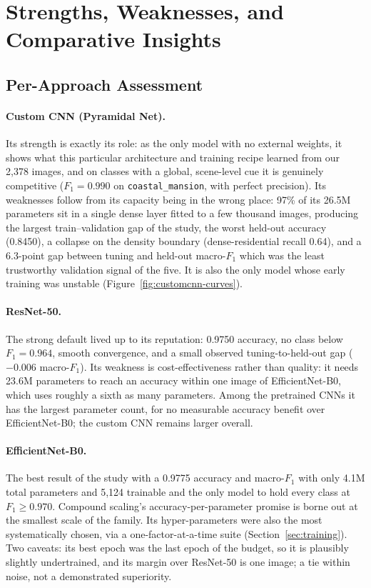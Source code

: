 \documentclass[11pt,twoside,a4paper]{article}
\begin{document}
\section{Strengths, Weaknesses, and Comparative Insights}
\label{sec:comparative}

\subsection{Per-Approach Assessment}

\paragraph{Custom CNN (Pyramidal Net).}
Its strength is exactly its role: as the only model with no external weights,
it shows what this particular architecture and training recipe learned from
our 2,378 images, and on classes with a
global, scene-level cue it is genuinely competitive ($F_1 = 0.990$ on
\texttt{coastal\_mansion}, with perfect precision). Its weaknesses follow
from its capacity being in the wrong place: 97\% of its 26.5M parameters sit
in a single dense layer fitted to a few thousand images, producing the
largest train--validation gap of the study, the worst held-out accuracy
(0.8450), a collapse on the density boundary (dense-residential recall
0.64), and a 6.3-point gap between tuning and held-out macro-$F_1$ which was the
least trustworthy validation signal of the five. It is also the only model
whose early training was unstable (Figure~\ref{fig:customcnn-curves}).

\paragraph{ResNet-50.}
The strong default lived up to its reputation: 0.9750 accuracy, no class
below $F_1 = 0.964$, smooth convergence, and a small observed
tuning-to-held-out gap ($-0.006$ macro-$F_1$). Its weakness is
cost-effectiveness rather than
quality: it needs 23.6M parameters to reach an accuracy within one image of
EfficientNet-B0, which uses roughly a sixth as many parameters. Among the
pretrained CNNs it has the largest parameter count, for no measurable accuracy
benefit over EfficientNet-B0; the custom CNN remains larger overall.

\paragraph{EfficientNet-B0.}
The best result of the study with a 0.9775 accuracy and macro-$F_1$ with only
4.1M total parameters and 5,124 trainable and the only model to hold
every class at $F_1 \geq 0.970$. Compound scaling's accuracy-per-parameter
promise \cite{Tan2019} is borne out at the smallest scale of the family. Its
hyper-parameters were also the most systematically chosen, via a
one-factor-at-a-time suite (Section~\ref{sec:training}). Two caveats: its
best epoch was the last epoch of the budget, so it is plausibly slightly
undertrained, and its margin over ResNet-50 is one image; a tie within
noise, not a demonstrated superiority.
\end{document}
